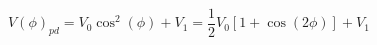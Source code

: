 \begin{equation}
\label{eq:Photodiode_Voltage}
V(\phi)_{pd} = V_{0} \cos^2(\phi)+ V_{1} = \frac{1}{2}V_0\left[1 + \cos(2 \phi)\right]+ V_1
\end{equation}